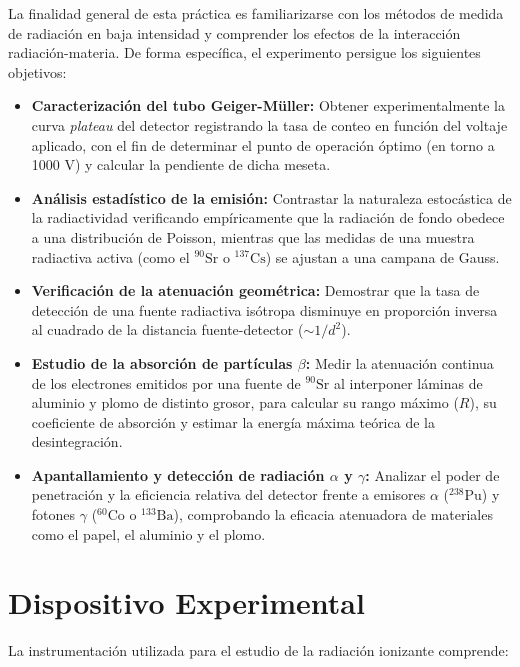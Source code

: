 \documentclass[9pt,a4paper,twocolumn,twoside]{rho-class/rho}
\begin{document}
La finalidad general de esta práctica es familiarizarse con los métodos de medida de radiación en baja intensidad y comprender los efectos de la interacción radiación-materia. %
De forma específica, el experimento persigue los siguientes objetivos: %

\begin{itemize}
    \item \textbf{Caracterización del tubo Geiger-Müller:} Obtener experimentalmente la curva \textit{plateau} del detector registrando la tasa de conteo en función del voltaje aplicado, con el fin de determinar el punto de operación óptimo (en torno a 1000 V) y calcular la pendiente de dicha meseta. %
    \item \textbf{Análisis estadístico de la emisión:} Contrastar la naturaleza estocástica de la radiactividad verificando empíricamente que la radiación de fondo obedece a una distribución de Poisson, mientras que las medidas de una muestra radiactiva activa (como el $^{90}\text{Sr}$ o $^{137}\text{Cs}$) se ajustan a una campana de Gauss. %
    \item \textbf{Verificación de la atenuación geométrica:} Demostrar que la tasa de detección de una fuente radiactiva isótropa disminuye en proporción inversa al cuadrado de la distancia fuente-detector ($\sim 1/d^2$). %
    \item \textbf{Estudio de la absorción de partículas $\beta$:} Medir la atenuación continua de los electrones emitidos por una fuente de $^{90}\text{Sr}$ al interponer láminas de aluminio y plomo de distinto grosor, para calcular su rango máximo ($R$), su coeficiente de absorción y estimar la energía máxima teórica de la desintegración. %
    \item \textbf{Apantallamiento y detección de radiación $\alpha$ y $\gamma$:} Analizar el poder de penetración y la eficiencia relativa del detector frente a emisores $\alpha$ ($^{238}\text{Pu}$) y fotones $\gamma$ ($^{60}\text{Co}$ o $^{133}\text{Ba}$), comprobando la eficacia atenuadora de materiales como el papel, el aluminio y el plomo. %
\end{itemize}

\section{Dispositivo Experimental}

La instrumentación utilizada para el estudio de la radiación ionizante comprende: %
\end{document}
